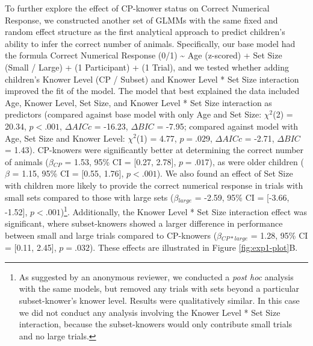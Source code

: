 \documentclass[
  man,floatsintext]{apa7}
\begin{document}
To further explore the effect of CP-knower status on Correct Numerical Response, we constructed another set of GLMMs with the same fixed and random effect structure as the first analytical approach to predict children's ability to infer the correct number of animals. Specifically, our base model had the formula Correct Numerical Response (0/1) \textasciitilde{} Age (z-scored) + Set Size (Small / Large) + (1 \textbar{} Participant) + (1 \textbar{} Trial), and we tested whether adding children's Knower Level (CP / Subset) and Knower Level * Set Size interaction improved the fit of the model. The model that best explained the data included Age, Knower Level, Set Size, and Knower Level * Set Size interaction as predictors (compared against base model with only Age and Set Size: \(\chi^2\)(2) = 20.34, \(p < .001\), \(\Delta AICc\) = -16.23, \(\Delta BIC\) = -7.95; compared against model with Age, Set Size and Knower Level: \(\chi^2\)(1) = 4.77, \(p = .029\), \(\Delta AICc\) = -2.71, \(\Delta BIC\) = 1.43). CP-knowers were significantly better at determining the correct number of animals (\(\beta\)\(_{CP}\) = 1.53, 95\% CI = {[}0.27, 2.78{]}, \(p = .017\)), as were older children (\(\beta\) = 1.15, 95\% CI = {[}0.55, 1.76{]}, \(p < .001\)). We also found an effect of Set Size with children more likely to provide the correct numerical response in trials with small sets compared to those with large sets (\(\beta\)\(_{large}\) = -2.59, 95\% CI = {[}-3.66, -1.52{]}, \(p < .001\))\footnote{As suggested by an anonymous reviewer, we conducted a \emph{post hoc} analysis with the same models, but removed any trials with sets beyond a particular subset-knower's knower level. Results were qualitatively similar. In this case we did not conduct any analysis involving the Knower Level * Set Size interaction, because the subset-knowers would only contribute small trials and no large trials.}.
Additionally, the Knower Level * Set Size interaction effect was significant, where subset-knowers showed a larger difference in performance between small and large trials compared to CP-knowers (\(\beta\)\(_{CP*large}\) = 1.28, 95\% CI = {[}0.11, 2.45{]}, \(p = .032\)). These effects are illustrated in Figure \ref{fig:exp1-plot}B.
\end{document}
